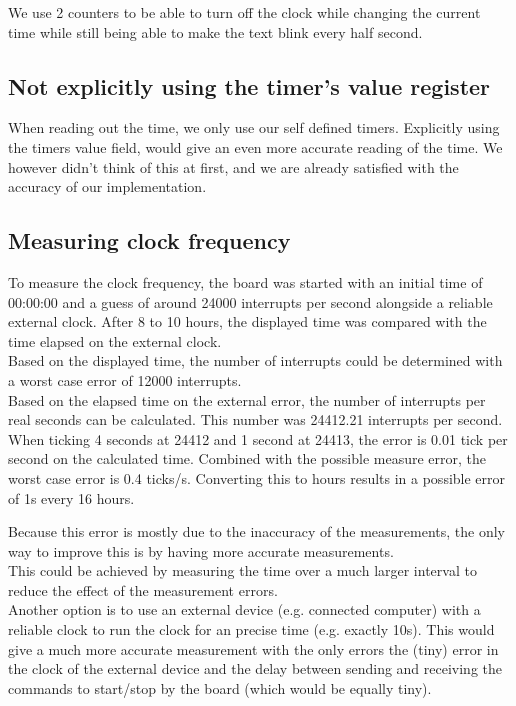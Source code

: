 \documentclass[11pt,a4paper]{scrartcl}
\begin{document}
We use 2 counters to be able to turn off the clock while changing the current time while still being able to make the text blink every half second.

\subsection{Not explicitly using the timer's value register}
When reading out the time, we only use our self defined timers. Explicitly using the timers value field, would give an even more accurate reading of the time. We however didn't think of this at first, and we are already satisfied with the accuracy of our implementation.

\subsection{Measuring clock frequency}
To measure the clock frequency, the board was started with an initial time of 00:00:00 and a guess of around 24000 interrupts per second alongside a reliable external clock. After 8 to 10 hours, the displayed time was compared with the time elapsed on the external clock.\\
Based on the displayed time, the number of interrupts could be determined with a worst case error of 12000 interrupts.\\
Based on the elapsed time on the external error, the number of interrupts per real seconds can be calculated. This number was 24412.21 interrupts per second.\\
When ticking 4 seconds at 24412 and 1 second at 24413, the error is 0.01 tick per second on the calculated time. Combined with the possible measure error, the worst case error is 0.4 ticks/s. Converting this to hours results in a possible error of 1s every 16 hours.

Because this error is mostly due to the inaccuracy of the measurements, the only way to improve this is by having more accurate measurements.\\
This could be achieved by measuring the time over a much larger interval to reduce the effect of the measurement errors.\\
Another option is to use an external device (e.g. connected computer) with a reliable clock to run the clock for an precise time (e.g. exactly 10s). This would give a much more accurate measurement with the only errors the (tiny) error in the clock of the external device and the delay between sending and receiving the commands to start/stop by the board (which would be equally tiny). 
\end{document}
